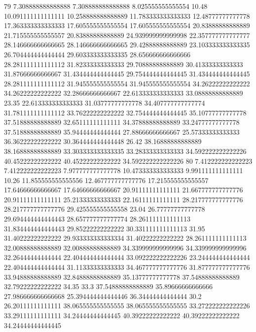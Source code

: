 79 7.308888888888888 7.308888888888888 8.025555555555554 10.48 10.091111111111111 10.258888888888889 11.783333333333333 12.48777777777778 17.363333333333333 17.605555555555554 17.605555555555554 20.83888888888889 21.715555555555557 20.83888888888889 24.939999999999998 22.357777777777777 28.146666666666665 28.146666666666665 29.42888888888889 23.103333333333335 26.704444444444444 29.603333333333335 28.656666666666666 28.281111111111112 31.82333333333333 29.70888888888889 30.41333333333333 31.87666666666667 31.434444444444445 29.754444444444445 31.434444444444445 28.281111111111112 31.945555555555554 31.945555555555554 34.26222222222222 34.26222222222222 32.28666666666667 22.613333333333333 33.08888888888889 23.35 22.613333333333333 31.03777777777778 34.407777777777774 31.781111111111112 33.76222222222222 32.754444444444445 35.10777777777778 37.51888888888889 32.65111111111111 34.37888888888889 33.24777777777778 37.51888888888889 35.94444444444444 27.88666666666667 25.57333333333333 36.36222222222222 30.364444444444448 26.42 38.16888888888889 38.16888888888889 33.303333333333335 33.28333333333333 34.592222222222226 40.45222222222222 40.45222222222222 34.592222222222226
80 7.412222222222223 7.412222222222223 7.977777777777778 10.473333333333333 9.991111111111111 10.26 11.855555555555556 12.467777777777776 17.215555555555557 17.64666666666667 17.64666666666667 20.91111111111111 21.667777777777776 20.91111111111111 25.21333333333333 22.16111111111111 28.217777777777776 28.217777777777776 29.425555555555558 23.04 26.77777777777778 29.694444444444443 28.657777777777774 28.261111111111113 31.834444444444443 29.85222222222222 30.331111111111113 31.95 31.40222222222222 29.933333333333334 31.40222222222222 28.261111111111113 32.00888888888889 32.00888888888889 34.339999999999996 34.339999999999996 32.26444444444444 22.404444444444444 33.092222222222226 23.244444444444444 22.404444444444444 31.11333333333333 34.467777777777776 31.877777777777776 33.94888888888889 32.84888888888889 35.13777777777778 37.54888888888889 32.79222222222222 34.35 33.3 37.54888888888889 35.89666666666666 27.986666666666668 25.394444444444446 36.34444444444444 30.2 26.20111111111111 38.065555555555555 38.065555555555555 33.272222222222226 33.29111111111111 34.24444444444445 40.39222222222222 40.39222222222222 34.24444444444445
